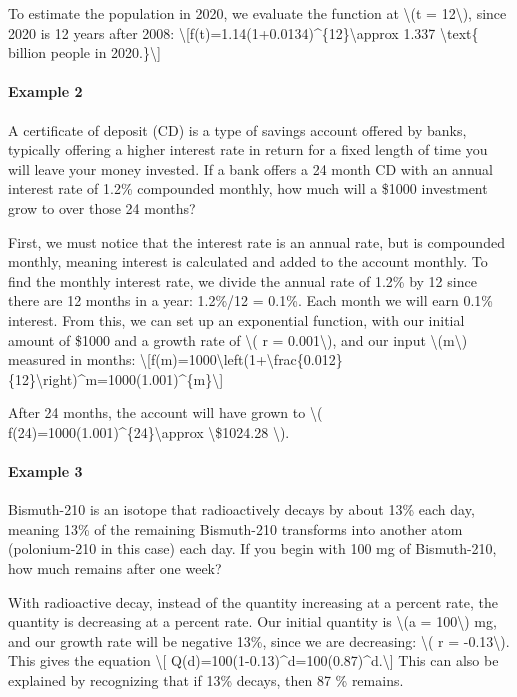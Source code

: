 To estimate the population in 2020, we evaluate the function at
\textbackslash{}(t = 12\textbackslash{}), since 2020 is 12 years after
2008:
\textbackslash{}{[}f(t)=1.14(1+0.0134)\^{}\{12\}\textbackslash{}approx
1.337 \textbackslash{}text\{ billion people in
2020.\}\textbackslash{}{]}

\hypertarget{example-2}{%
\paragraph{Example 2}\label{example-2}}

A certificate of deposit (CD) is a type of savings account offered by
banks, typically offering a higher interest rate in return for a fixed
length of time you will leave your money invested. If a bank offers a 24
month CD with an annual interest rate of 1.2\% compounded monthly, how
much will a \$1000 investment grow to over those 24 months?

First, we must notice that the interest rate is an annual rate, but is
compounded monthly, meaning interest is calculated and added to the
account monthly. To find the monthly interest rate, we divide the annual
rate of 1.2\% by 12 since there are 12 months in a year: 1.2\%/12 =
0.1\%. Each month we will earn 0.1\% interest. From this, we can set up
an exponential function, with our initial amount of \$1000 and a growth
rate of \textbackslash{}( r = 0.001\textbackslash{}), and our input
\textbackslash{}(m\textbackslash{}) measured in months:
\textbackslash{}{[}f(m)=1000\textbackslash{}left(1+\textbackslash{}frac\{0.012\}\{12\}\textbackslash{}right)\^{}m=1000(1.001)\^{}\{m\}\textbackslash{}{]}

After 24 months, the account will have grown to \textbackslash{}(
f(24)=1000(1.001)\^{}\{24\}\textbackslash{}approx
\textbackslash{}\$1024.28 \textbackslash{}).

\hypertarget{example-3}{%
\paragraph{Example 3}\label{example-3}}

Bismuth-210 is an isotope that radioactively decays by about 13\% each
day, meaning 13\% of the remaining Bismuth-210 transforms into another
atom (polonium-210 in this case) each day. If you begin with 100 mg of
Bismuth-210, how much remains after one week?

With radioactive decay, instead of the quantity increasing at a percent
rate, the quantity is decreasing at a percent rate. Our initial quantity
is \textbackslash{}(a = 100\textbackslash{}) mg, and our growth rate
will be negative 13\%, since we are decreasing: \textbackslash{}( r =
-0.13\textbackslash{}). This gives the equation \textbackslash{}{[}
Q(d)=100(1-0.13)\^{}d=100(0.87)\^{}d.\textbackslash{}{]} This can also
be explained by recognizing that if 13\% decays, then 87 \% remains.

